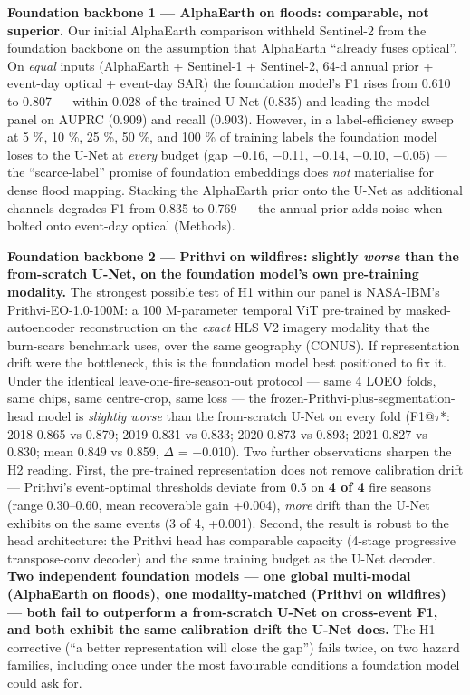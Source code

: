 \documentclass[sn-nature,lineno]{sn-jnl}
\theoremstyle{thmstyleone}
\theoremstyle{thmstyletwo}
\theoremstyle{thmstylethree}
\begin{document}
\textbf{Foundation backbone 1 --- AlphaEarth on floods: comparable, not
superior.} Our initial AlphaEarth comparison withheld Sentinel-2 from
the foundation backbone on the assumption that AlphaEarth ``already fuses
optical''. On \emph{equal} inputs (AlphaEarth + Sentinel-1 + Sentinel-2, 64-d
annual prior + event-day optical + event-day SAR) the foundation model's
F1 rises from 0.610 to 0.807 --- within 0.028 of the trained U-Net (0.835)
and leading the model panel on AUPRC (0.909) and recall (0.903).
However, in a label-efficiency sweep at 5 \%, 10 \%, 25 \%, 50 \%, and 100 \%
of training labels the foundation model loses to the U-Net at \emph{every}
budget (gap $-$0.16, $-$0.11, $-$0.14, $-$0.10, $-$0.05) --- the ``scarce-label''
promise of foundation embeddings does \emph{not} materialise for dense flood
mapping. Stacking the AlphaEarth prior onto the U-Net as additional
channels degrades F1 from 0.835 to 0.769 --- the annual prior adds noise
when bolted onto event-day optical (Methods).

\textbf{Foundation backbone 2 --- Prithvi on wildfires: slightly \emph{worse} than
the from-scratch U-Net, on the foundation model's own pre-training
modality.} The strongest possible test of H1 within our panel is
NASA-IBM's Prithvi-EO-1.0-100M: a 100 M-parameter temporal ViT
pre-trained by masked-autoencoder reconstruction on the \emph{exact} HLS V2
imagery modality that the burn-scars benchmark uses, over the same
geography (CONUS). If representation drift were the bottleneck, this is
the foundation model best positioned to fix it. Under the identical
leave-one-fire-season-out protocol --- same 4 LOEO folds, same chips,
same centre-crop, same loss --- the frozen-Prithvi-plus-segmentation-head
model is \emph{slightly worse} than the from-scratch U-Net on every fold
(F1@$\tau$*: 2018 0.865 vs 0.879; 2019 0.831 vs 0.833; 2020 0.873 vs 0.893;
2021 0.827 vs 0.830; mean 0.849 vs 0.859, $\Delta$ = $-$0.010). Two further
observations sharpen the H2 reading. First, the pre-trained
representation does not remove calibration drift --- Prithvi's
event-optimal thresholds deviate from 0.5 on \textbf{4 of 4} fire seasons
(range 0.30--0.60, mean recoverable gain +0.004), \emph{more} drift than the
U-Net exhibits on the same events (3 of 4, +0.001). Second, the result
is robust to the head architecture: the Prithvi head has comparable
capacity (4-stage progressive transpose-conv decoder) and the same
training budget as the U-Net decoder. \textbf{Two independent foundation
models --- one global multi-modal (AlphaEarth on floods), one
modality-matched (Prithvi on wildfires) --- both fail to outperform a
from-scratch U-Net on cross-event F1, and both exhibit the same
calibration drift the U-Net does.} The H1 corrective (``a better
representation will close the gap'') fails twice, on two hazard
families, including once under the most favourable conditions a
foundation model could ask for.
\end{document}
